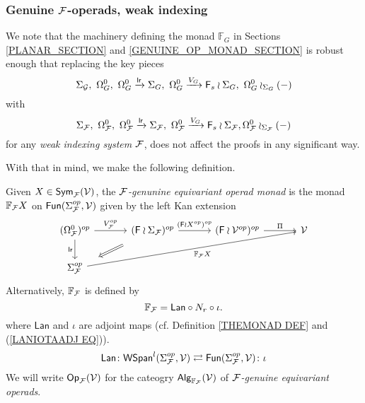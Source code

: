 \documentclass[a4paper,10pt]{article}%
\begin{document}
\newpage

\subsubsection{Genuine $\mathcal F$-operads, weak indexing}


We note that the machinery defining the monad $\mathbb F_G$ in Sections \ref{PLANAR_SECTION} and \ref{GENUINE_OP_MONAD_SECTION} is robust enough that replacing the key pieces 
\[
\Sigma_{\mathcal{G}},\ \Omega_G^0,\ \Omega_G^0 \xrightarrow{\mathsf{lr}} \Sigma_G,\ \Omega_G^0 \xrightarrow{V_G} \mathsf{F}_s \wr \Sigma_G,\ \Omega_G^0 \wr_{\Sigma_G} (-)
\]
with
\[
\Sigma_{\mathcal F},\ \Omega_{\mathcal F}^0,\ \Omega_{\mathcal F}^0 \xrightarrow{\mathsf{lr}} \Sigma_{\mathcal F},\ \Omega_{\mathcal F}^0 \xrightarrow{V_G} \mathsf{F}_s \wr \Sigma_{\mathcal F}, \Omega_{\mathcal F}^0 \wr_{\Sigma_{\mathcal F}} (-)
\]
for any \textit{weak indexing system} $\mathcal F$, does not affect the proofs in any significant way. 

With that in mind, we make the following definition.

\begin{definition}
        Given $X\in \mathsf{Sym}_{\mathcal F}(\mathcal V)$, the \textit{$\mathcal F$-genunine equivariant operad monad} is the monad $\mathbb F_{\mathcal F} X$ on $\mathsf{Fun}(\Sigma_{\mathcal F}^{op}, \mathcal V)$ given by the left Kan extension
        \begin{equation}
                \begin{tikzcd}[row sep=2em,column sep = 3.3em]
                        (\Omega_{\F}^{0})^{op} \ar{r}{V_{\F}^{op}} \ar{d}[swap]{\mathsf{lr}} &
                        |[alias=F1]|
                        (\Fin \wr \Sigma_\F)^{op} \ar{r}[swap,name=F2]{}{(\Fin \wr X^{op})^{op}}& (\Fin \wr \mathcal{V}^{op})^{op} \ar{r}{\Pi} & \mathcal{V}
                        \\
                        |[alias=G2]|
                        \Sigma_\F^{op}  \ar{urrr}[swap]{\mathbb{F}_\F X} & &
                        \arrow[Rightarrow, from=F1, to=G2,shorten >=0.45cm,shorten <=0.45cm]
                \end{tikzcd}
        \end{equation}
        Alternatively, $\mathbb F_{\mathcal F}$ is defined by
        \[
        \mathbb F_{\mathcal F} = \mathsf{Lan} \circ N_r \circ \iota.
        \]
        where $\mathsf{Lan}$ and $\iota$ are adjoint maps 
        (cf. Definition \ref{THEMONAD DEF} and (\ref{LANIOTAADJ EQ})).
        \[    
        \mathsf{Lan} \colon
        \mathsf{WSpan}^l(\Sigma^{op}_{\mathcal F}, \mathcal{V})
        \rightleftarrows
        \mathsf{Fun}(\Sigma^{op}_{\mathcal F}, \mathcal{V})
        \colon \iota
        \]
        We will write $\mathsf{Op}_{\mathcal F}(\mathcal V)$ for the cateogry $\mathsf{Alg}_{\mathbb F_{\mathcal F}}(\mathcal V)$ of \textit{$\mathcal F$-genuine equivariant operads}.
\end{definition}
\end{document}
